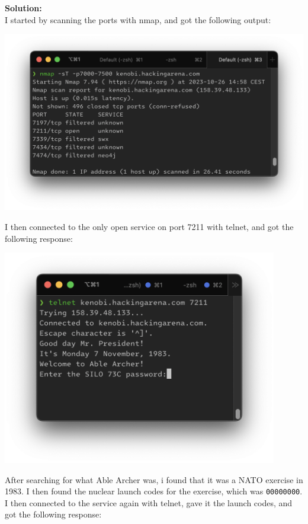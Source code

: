 \textbf{Solution:}\\
I started by scanning the ports with nmap, and got the following output:

\begin{center}
    \includegraphics[width=14cm]{img/Get in touch with services/Minuteman/Skjermbilde 2023-10-26 kl. 15.14.45.png}
\end{center}

I then connected to the only open service on port 7211 with telnet, and got the following response:

\begin{center}
    \includegraphics[width=12cm]{img/Get in touch with services/Minuteman/Skjermbilde 2023-10-27 kl. 09.30.39.png}
\end{center}

After searching for what Able Archer was, i found that it was a NATO exercise in 1983. I then found the nuclear launch codes for the exercise, which was \texttt{00000000}. I then connected to the service again with telnet, gave it the launch codes, and got the following response:

